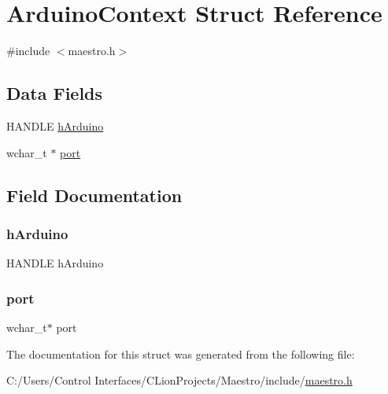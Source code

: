 \hypertarget{struct_arduino_context}{}\section{Arduino\+Context Struct Reference}
\label{struct_arduino_context}


{\ttfamily \#include $<$maestro.\+h$>$}

\subsection*{Data Fields}
\begin{DoxyCompactItemize}
\item 
H\+A\+N\+D\+LE \hyperlink{struct_arduino_context_a9cb58ca1c0a2494920605e0065bfeed2}{h\+Arduino}
\item 
wchar\+\_\+t $\ast$ \hyperlink{struct_arduino_context_a9a1f9b09559c34ed90b0163c572dfe75}{port}
\end{DoxyCompactItemize}


\subsection{Field Documentation}
\mbox{\label{struct_arduino_context_a9cb58ca1c0a2494920605e0065bfeed2}} 
\subsubsection{\texorpdfstring{h\+Arduino}{hArduino}}
{\footnotesize\ttfamily H\+A\+N\+D\+LE h\+Arduino}

\mbox{\label{struct_arduino_context_a9a1f9b09559c34ed90b0163c572dfe75}} 
\subsubsection{\texorpdfstring{port}{port}}
{\footnotesize\ttfamily wchar\+\_\+t$\ast$ port}



The documentation for this struct was generated from the following file\+:\begin{DoxyCompactItemize}
\item 
C\+:/\+Users/\+Control Interfaces/\+C\+Lion\+Projects/\+Maestro/include/\hyperlink{maestro_8h}{maestro.\+h}\end{DoxyCompactItemize}
